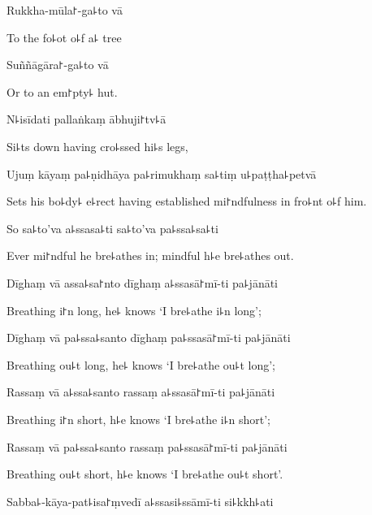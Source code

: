Rukkha-mūla꜓-ga꜕to vā

\begin{english}
  To the fo꜕ot o꜕f a꜕ tree
\end{english}

Suññāgāra꜓-ga꜕to vā

\begin{english}
  Or to an em꜓pty꜕ hut.
\end{english}

N꜕isīdati pallaṅkaṃ ābhuji꜓tv꜕ā

\begin{english}
  Si꜕ts down having cro꜕ssed hi꜕s legs,
\end{english}

Ujuṃ kāyaṃ pa꜕ṇidhāya pa꜕rimukhaṃ sa꜕tiṃ u꜕paṭṭha꜕petvā

\begin{english}
  Sets his bo꜕dy꜕ e꜕rect having established mi꜓ndfulness in fro꜕nt o꜕f him.
\end{english}

So sa꜕to'va a꜕ssasa꜕ti sa꜕to'va pa꜕ssa꜕sa꜕ti

\begin{english}
  Ever mi꜓ndful he bre꜕athes in; mindful h꜕e bre꜕athes out.
\end{english}

Dīghaṃ vā assa꜕sa꜓nto dīghaṃ a꜕ssasā꜓mī-ti pa꜕jānāti

\begin{english}
  Breathing i꜓n long, he꜕ knows `I bre꜕athe i꜕n long';
\end{english}

Dīghaṃ vā pa꜕ssa꜕santo dīghaṃ pa꜕ssasā꜓mī-ti pa꜕jānāti

\begin{english}
  Breathing ou꜕t long, he꜕ knows `I bre꜕athe ou꜕t long';
\end{english}

Rassaṃ vā a꜕ssa꜕santo rassaṃ a꜕ssasā꜓mī-ti pa꜕jānāti

\begin{english}
  Breathing i꜓n short, h꜕e knows `I bre꜕athe i꜕n short';
\end{english}

Rassaṃ vā pa꜕ssa꜕santo rassaṃ pa꜕ssasā꜓mī-ti pa꜕jānāti

\begin{english}
  Breathing ou꜕t short, h꜕e knows `I bre꜕athe ou꜕t short'.
\end{english}

Sabba꜕-kāya-pat꜕isa꜓ṃvedī a꜕ssasi꜕ssāmī-ti si꜕kkh꜕ati

